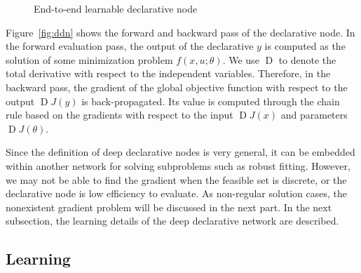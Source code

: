 \begin{figure}

    \caption{End-to-end learnable declarative node}
\end{figure}
\par Figure~\ref{fig:ddn} shows the forward and backward pass of the declarative node. In the forward evaluation pass, the output of the declarative $y$ is computed as the solution of some minimization problem $f(x, u; \theta)$. We use $\operatorname{D}$ to denote the total derivative with respect to the independent variables. Therefore, in the backward pass, the gradient of the global objective function with respect to the output $\operatorname{D}J(y)$ is back-propagated. Its value is computed through the chain rule based on the gradients with respect to the input $\operatorname{D}J(x)$ and parameters $\operatorname{D}J(\theta)$.
\par Since the definition of deep declarative nodes is very general, it can be embedded within another network for solving subproblems such as robust fitting. However, we may not be able to find the gradient when the feasible set is discrete, or the declarative node is low efficiency to evaluate. As non-regular solution cases, the nonexistent gradient problem will be discussed in the next part. In the next subsection, the learning details of the deep declarative network are described. 

\subsection{Learning}



